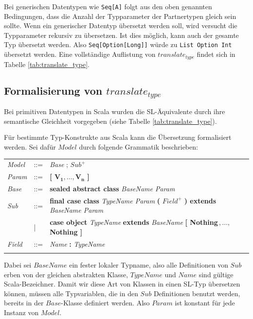 \documentclass[12pt,bibtotoc]{scrreprt}
\begin{document}
Bei generischen Datentypen wie \lstinline!Seq[A]! folgt aus den oben genannten Bedingungen, dass die Anzahl der Typparameter der Partnertypen gleich sein sollte. Wenn ein generischer Datentyp übersetzt werden soll, wird versucht die Typparameter rekursiv zu übersetzen. Ist dies möglich, kann auch der gesamte Typ übersetzt werden. Also \lstinline!Seq[Option[Long]]! würde zu \lstinline!List Option Int! übersetzt werden. Eine vollständige Auflistung von $translate_{type}$ findet sich in Tabelle \ref{tab:translate_type}.

\subsection{Formalisierung von $translate_{type}$}
\label{subsec:formal-translate-typ}

Bei primitiven Datentypen in Scala wurden die SL-Äquivalente durch ihre semantische Gleichheit vorgegeben (siehe Tabelle \ref{tab:translate_type}). 

Für bestimmte Typ-Konstrukte aus Scala kann die Übersetzung formalisiert werden. Sei dafür $Model$ durch folgende Grammatik beschrieben:

\begin{tabular}{lll}
\emph{Model} & ::= & \emph{Base} ; \emph{$Sub^+$}\\
\emph{Param} & ::= & \textbf{[ $\mathbf{V_1, \dots ,V_n}$ ]}\\
\emph{Base}  & ::= & \textbf{sealed abstract class} \emph{BaseName Param}\\
\emph{Sub}   & ::=   & \textbf{final case class} \emph{TypeName Param} \textbf{(} $Field^+$ \textbf{) extends} \emph{BaseName Param}\\
 & | & \textbf{case object} \emph{TypeName} \textbf{extends} \emph{BaseName} \textbf{[ Nothing$\,,\dots,\,$Nothing ]}\\
\emph{Field} & ::= & \emph{Name} \textbf{:} \emph{TypeName}\\
\\
\end{tabular}

Dabei sei $BaseName$ ein fester lokaler Typname, also alle Definitionen von $Sub$ erben von der gleichen abstrakten Klasse, $TypeName$ und $Name$ sind gültige Scala-Bezeichner. Damit wir diese Art von Klassen in einen SL-Typ übersetzen können, müssen alle Typvariablen, die in den $Sub$ Definitionen benutzt werden, bereits in der $Base$-Klasse definiert werden. Also $Param$ ist konstant für jede Instanz von $Model$.
\end{document}

